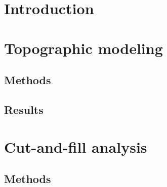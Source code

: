 \documentclass[Afour,sageh,times]{sagej}
\begin{document}















\clearpage




\section{Introduction}


\section{Topographic modeling}
\subsection{Methods}
\subsection{Results}

\section{Cut-and-fill analysis}
\subsection{Methods}
\end{document}
